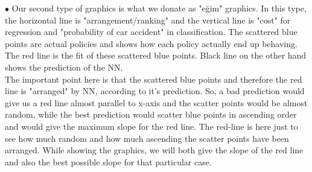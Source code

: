 \documentclass[titlepage, a4paper, 14pt]{extarticle} %
\begin{document}
$\bullet$ Our second type of graphics is what we donate as "eğim" graphics. In this type, the horizontal line is "arrangement/ranking" and the vertical line is "cost" for regression and "probability of car accident" in classification. The scattered blue points are actual policies and shows how each policy actually end up behaving. The red line is the fit of these scattered blue points. Black line on the other hand shows the prediction of the NN.\\ The important point here is that the scattered blue points and therefore the red line is "arranged" by NN, according to it's prediction. So, a bad prediction would give us a red line almost parallel to x-axis and the scatter points would be almost random, while the best prediction would scatter blue points in ascending order and would give the maximum slope for the red line. The red-line is here just to see how much random and how much ascending the scatter points have been arranged. While showing the graphics, we will both give the slope of the red line and also the best possible slope for that particular case.\\
\end{document}
